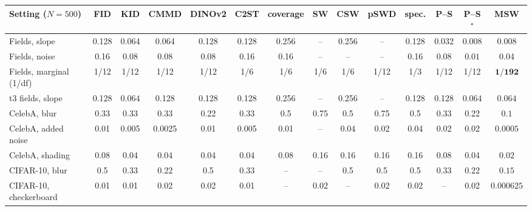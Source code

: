 \begin{tabular}{lccccccccccccc}
\toprule
Setting ($N{=}500$) & FID & KID & CMMD & DINOv2 & C2ST & coverage & SW & CSW & pSWD & spec. & P--S & P--S$^\star$ & MSW \\
\midrule
Fields, slope & 0.128 & 0.064 & 0.064 & 0.128 & 0.128 & 0.256 & -- & 0.256 & -- & 0.128 & 0.032 & $\mathbf{0.008}$ & $\mathbf{0.008}$ \\
Fields, noise & 0.16 & 0.08 & 0.08 & 0.08 & 0.16 & 0.16 & -- & -- & -- & 0.16 & 0.08 & $\mathbf{0.01}$ & 0.04 \\
Fields, marginal (1/df) & 1/12 & 1/12 & 1/12 & 1/12 & 1/6 & 1/6 & 1/6 & 1/6 & 1/12 & 1/3 & 1/12 & 1/12 & $\mathbf{1/192}$ \\
t3 fields, slope & 0.128 & $\mathbf{0.064}$ & 0.128 & 0.128 & 0.128 & 0.256 & -- & 0.256 & -- & 0.128 & 0.128 & $\mathbf{0.064}$ & $\mathbf{0.064}$ \\
CelebA, blur & 0.33 & 0.33 & 0.33 & 0.22 & 0.33 & 0.5 & 0.75 & 0.5 & 0.75 & 0.5 & 0.33 & 0.22 & $\mathbf{0.1}$ \\
CelebA, added noise & 0.01 & 0.005 & 0.0025 & 0.01 & 0.005 & 0.01 & -- & 0.04 & 0.02 & 0.04 & 0.02 & 0.02 & $\mathbf{0.0005}$ \\
CelebA, shading & 0.08 & 0.04 & 0.04 & 0.04 & 0.04 & 0.08 & 0.16 & 0.16 & 0.16 & 0.16 & 0.08 & 0.04 & $\mathbf{0.02}$ \\
CIFAR-10, blur & 0.5 & 0.33 & 0.22 & 0.5 & 0.33 & -- & -- & 0.5 & 0.5 & 0.5 & 0.33 & 0.22 & $\mathbf{0.15}$ \\
CIFAR-10, checkerboard & 0.01 & 0.01 & 0.02 & 0.02 & 0.01 & -- & 0.02 & -- & 0.02 & 0.02 & -- & 0.02 & $\mathbf{0.000625}$ \\
\bottomrule
\end{tabular}
